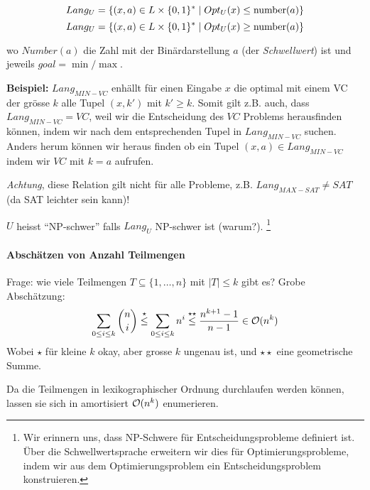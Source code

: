 \[ Lang_U = \{ (x, a) \in L \times \lbrace 0, 1 \rbrace^* \; | \; Opt_U(x) \leq \text{number}(a) \} \]
\[ Lang_U = \{ (x, a) \in L \times \lbrace 0, 1 \rbrace^* \; | \; Opt_U(x) \geq \text{number}(a) \} \]

wo $Number(a)$ die Zahl mit der Binärdarstellung $a$ (der 
\emph{Schwellwert}) ist und jeweils $goal = \min/\max$. 

\textbf{Beispiel:} $Lang_{MIN-VC}$ enhällt für einen Eingabe $x$ die 
optimal mit einem VC der grösse $k$ alle Tupel $(x, k')$ mit $k' \geq k$. 
Somit gilt z.B. auch, dass $Lang_{MIN-VC} = VC$, weil wir die 
Entscheidung des $VC$ Problems herausfinden können, indem wir 
nach dem entsprechenden Tupel in $Lang_{MIN-VC}$ suchen. Anders 
herum können wir heraus finden ob ein Tupel $(x, a) \in Lang_{MIN-VC}$ 
indem wir $VC$ mit $k = a$ aufrufen.

\emph{Achtung}, diese Relation gilt nicht für alle Probleme, z.B. 
$Lang_{MAX-SAT} \neq SAT$ (da SAT leichter sein kann)!

$U$ heisst ``NP-schwer'' falls $Lang_U$ NP-schwer ist (warum?).%
\footnote{Wir erinnern uns, dass NP-Schwere für Entscheidungsprobleme 
definiert ist. Über die Schwellwertsprache erweitern wir dies für 
Optimierungsprobleme, indem wir aus dem Optimierungsproblem ein 
Entscheidungsproblem konstruieren.}

\paragraph{Abschätzen von Anzahl Teilmengen}
Frage: wie viele Teilmengen $T \subseteq \{1, \dots, n\}$ mit $|T| \leq k$ gibt es?
Grobe Abschätzung:
$$ \sum_{0 \leq i \leq k} \binom{n}{i}
\overset{\star}{\leq} \sum_{0 \leq i \leq k} n^i
\overset{\star\star}{\leq} \frac{n^{k+1} - 1}{n-1} \in \mathcal{O}(n^k) $$
Wobei $\star$ für kleine $k$ okay, aber grosse $k$ ungenau ist, und $\star\star$ 
eine geometrische Summe.

Da die Teilmengen in lexikographischer Ordnung durchlaufen werden können, 
lassen sie sich in amortisiert
$\mathcal{O}(n^k)$ enumerieren.
